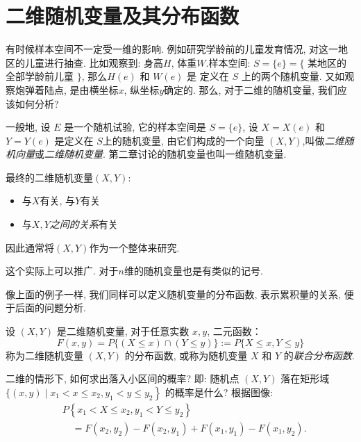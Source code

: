 \section{二维随机变量及其分布函数}

有时候样本空间不一定受一维的影响. 例如研究学龄前的儿童发育情况, 对这一地区的儿童进行抽查.
比如观察到: 身高$H$, 体重$W$.样本空间: $S=\{e\}=\{$ 某地区的全部学龄前儿童 $\}$, 那么$H(e)$ 和 $W(e)$ 是 定义在 $S$ 上的两个随机变量.
又如观察炮弹着陆点, 是由横坐标$x$, 纵坐标$y$确定的. 那么, 对于二维的随机变量, 我们应该如何分析? 

\begin{definition}[二维随机变量]
  一般地, 设 $E$ 是一个随机试验, 它的样本空间是 $S=\{e\}$, 设 $X=X(e)$ 和 $Y=Y(e)$ 是定义在 $S$上的随机变量, 由它们构成的一个向量 $(X, Y)$,叫做\emph{二维随机向量}或\emph{二维随机变量}. 第二章讨论的随机变量也叫一维随机变量.
\end{definition}

最终的二维随机变量$(X,Y)$:
    \begin{itemize}
        \item 与$X$有关, 与$Y$有关
        \item 与$X,Y$\emph{之间的关系}有关
    \end{itemize}
  因此通常将$(X,Y)$作为一个整体来研究.

  \begin{remark}
    这个实际上可以推广. 对于$n$维的随机变量也是有类似的记号.  
  \end{remark}

  

  像上面的例子一样, 我们同样可以定义随机变量的分布函数, 表示累积量的关系, 便于后面的问题分析. 
  \begin{definition}[多维变量的分布函数]
    \label{def:cumdist}
    设 $(X, Y)$ 是二维随机变量, 对于任意实数 $x, y$, 二元函数：
    $$
        F(x, y)=P\{(X \leqslant x) \cap(Y \leqslant y)\} := P\{X \leqslant x, Y \leqslant y\}
    $$
    称为二维随机变量 $(X, Y)$ 的分布函数, 或称为随机变量 $X$ 和 $Y$ 的\emph{联合分布函数}.
\end{definition}

二维的情形下, 如何求出落入小区间的概率? 即: 随机点 $(X, Y)$ 落在矩形域 $\{(x, y)\mid \left.x_1<x \leqslant x_2, y_1<y \leqslant y_2\right\}$ 的概率是什么?
  根据图像: 
  $$
        \begin{aligned}
             & P\left\{x_1<X \leqslant x_2, y_1<Y \leqslant y_2\right\}                                            \\
             & \quad=F\left(x_2, y_2\right)-F\left(x_2, y_1\right)+F\left(x_1, y_1\right)-F\left(x_1, y_2\right) .
        \end{aligned}
    $$

